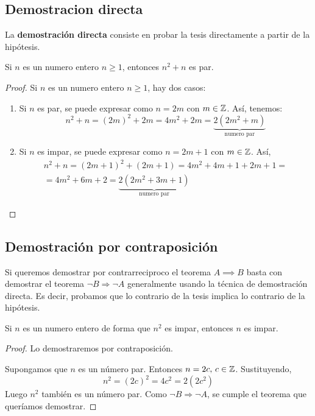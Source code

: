 \subsection{Demostracion directa}
La \textbf{demostración directa} consiste en probar la tesis directamente a partir de la hipótesis.

\begin{theorem}
	Si \(n \) es un numero entero \(n \geq  1\), entonces \(n^{2 } + n \) es par.
\end{theorem}
\begin{proof}
	Si \(n \) es un numero entero \(n \geq  1 \), hay dos casos:
	\begin{enumerate}
		\item Si \(n \) es par, se puede expresar como \(n =2m \) con \(m \in  \mathbb{Z} \). Así, tenemos:
		      \[
			      n^{2} + n = (2m)^{2} + 2m  = 4m^{2} + 2m = \underbrace{2(2m^{2}+m)}_{\text{numero par} }
		      \]
		\item Si \(n \) es impar, se puede expresar como \(n = 2m +1 \) con \(m \in  \mathbb{Z} \). Así,
		      \begin{multline*}
			      n^{2} + n = (2m + 1 )^{2} + (2m+1 ) = 4m^{2} + 4m + 1 + 2m + 1 = \\= 4m^{2} + 6m + 2 = \underbrace{2(2m^{2} + 3m + 1)}_{\text{numero par} }
		      \end{multline*}
	\end{enumerate}
\end{proof}

\subsection{Demostración por contraposición}

Si queremos demostrar por contrarreciproco el teorema \(A \implies B \)  basta con demostrar el teorema \(\neg B \Rightarrow \neg A \) generalmente usando la técnica de demostración directa. Es decir, probamos que lo contrario de la tesis implica lo contrario de la hipótesis.

\begin{theorem}
	Si \(n \) es un numero entero de forma que \(n^{2 } \) es impar, entonces \(n \) es impar.
\end{theorem}
\begin{proof}
	Lo demostraremos por contraposición.
	
	Supongamos que \(n  \) es un número par. Entonces \(n = 2c, \, c \in \mathbb{Z}\). Sustituyendo,
	\[
		n^{2} = (2c)^{2} = 4c^{2} = 2(2c^{2})
	\]
	Luego \(n^{2} \) también es un número par. Como \(\neg B \Rightarrow \neg A \), se cumple el teorema que queríamos demostrar.
\end{proof}

